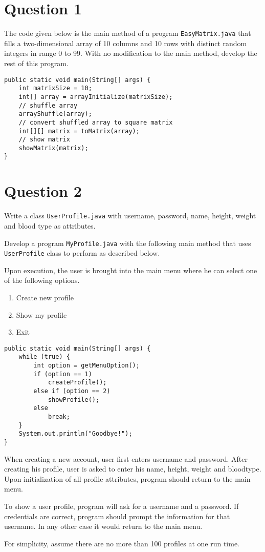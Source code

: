 \documentclass[12pt,letterpaper,twoside]{article}
\begin{document}


\section*{Question 1}

The code given below is the main method of a program \texttt{EasyMatrix.java} that fills a two-dimensional array of 10 columns and 10 rows with distinct random integers in range 0 to 99. With no modification to the main method, develop the rest of this program.

\lstset{language=java}
\begin{lstlisting}
public static void main(String[] args) {
	int matrixSize = 10;
	int[] array = arrayInitialize(matrixSize);
	// shuffle array
	arrayShuffle(array);
	// convert shuffled array to square matrix
	int[][] matrix = toMatrix(array);
	// show matrix
	showMatrix(matrix);
}
\end{lstlisting}

\section*{Question 2}

Write a class \texttt{UserProfile.java} with username, password, name, height, weight and blood type as attributes.

Develop a program \texttt{MyProfile.java} with the following main method that uses \texttt{UserProfile} class to perform as described below.

Upon execution, the user is brought into the main menu where he can select one of the following options.
\begin{enumerate}[itemsep=0pt]
\parskip=0pt \parsep=0pt
\item Create new profile
\item Show my profile
\item Exit
\end{enumerate}

\lstset{language=java}
\begin{lstlisting}
public static void main(String[] args) {
	while (true) {
		int option = getMenuOption();
		if (option == 1)
			createProfile();
		else if (option == 2)
			showProfile();
		else
			break;
	}
	System.out.println("Goodbye!");
}
\end{lstlisting}

When creating a new account, user first enters username and password. After creating his profile, user is asked to enter his name, height, weight and bloodtype. Upon initialization of all profile attributes, program should return to the main menu.

To show a user profile, program will ask for a username and a password. If credentials are correct, program should prompt the information for that username. In any other case it would return to the main menu.

For simplicity, assume there are no more than 100 profiles at one run time.

\end{document}
